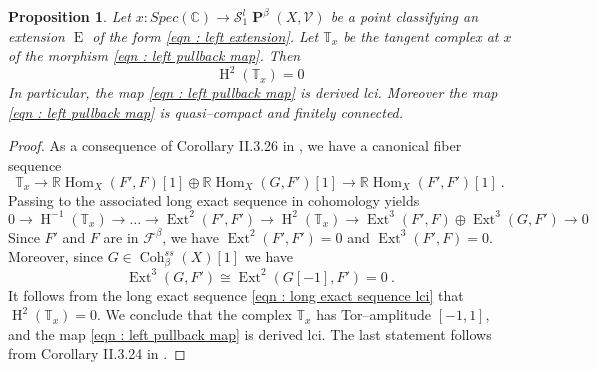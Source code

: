 \documentclass[11pt]{article}
\newtheorem{proposition}[theorem]{Proposition}
\newcommand{\BC}{\mathbb{C}}
\newcommand{\segal}{\mathcal{S}}
\newcommand{\fbeta}{\mathcal{F}^{\beta}}
\newcommand{\cohbetass}{\operatorname{Coh}^{ss}_{\beta}(X)}
\newcommand{\pairs}{\boldsymbol{\operatorname{P}}^{\beta}(X,\mathcal{V})}
\begin{document}
\begin{proposition}
    Let $x \colon Spec(\BC) \rightarrow \segal_1^l\pairs$ be a point classifying an extension $\operatorname{E}$ of the form \eqref{eqn : left extension}. Let $\mathbb{T}_x$ be the tangent complex at $x$ of the morphism \eqref{eqn : left pullback map}. Then
    \begin{equation}\label{eqn : h0 is 0}
        \operatorname{H}^2(\mathbb{T}_x)  =0 
    \end{equation}
    In particular, the map \eqref{eqn : left pullback map} is derived lci. Moreover the map \eqref{eqn : left pullback map} is quasi--compact and finitely connected.
\end{proposition}
\begin{proof}
    As a consequence of Corollary II.3.26 in \cite{dps}, we have a canonical fiber sequence
    \[
        \mathbb{T}_x \rightarrow \mathbb{R}\operatorname{Hom}_X(F',F)[1] \oplus \mathbb{R}\operatorname{Hom}_X(G,F')[1] \rightarrow \mathbb{R}\operatorname{Hom}_X(F',F')[1]  \   .
    \]
Passing to the associated long exact sequence in cohomology yields
\begin{equation}\label{eqn : long exact sequence lci}
   0 \rightarrow \operatorname{H}^{-1}(\mathbb{T}_x) \rightarrow \dots \rightarrow \operatorname{Ext}^2(F',F') \rightarrow \operatorname{H}^2(\mathbb{T}_x) \rightarrow\operatorname{Ext}^3(F',F) \oplus\operatorname{Ext}^3(G,F') \rightarrow 0
\end{equation}
Since $F '$ and $F$ are in $\fbeta$, we have 
$\operatorname{Ext}^2(F',F')  =0$ and $\operatorname{Ext}^3(F',F) =0$. Moreover, since $G \in \cohbetass[1]$ we have
\[
    \operatorname{Ext}^3(G,F') \cong \operatorname{Ext}^2(G[-1],F') =0 \ .
\]
    It follows from the long exact sequence \eqref{eqn : long exact sequence lci} that $\operatorname{H}^2(\mathbb{T}_x) =0$. We conclude that the complex $\mathbb{T}_x$ has Tor--amplitude $[-1,1]$, and the map \eqref{eqn : left pullback map} is derived lci. The last statement follows from Corollary II.3.24 in \cite{dps}.
\end{proof}
\end{document}
